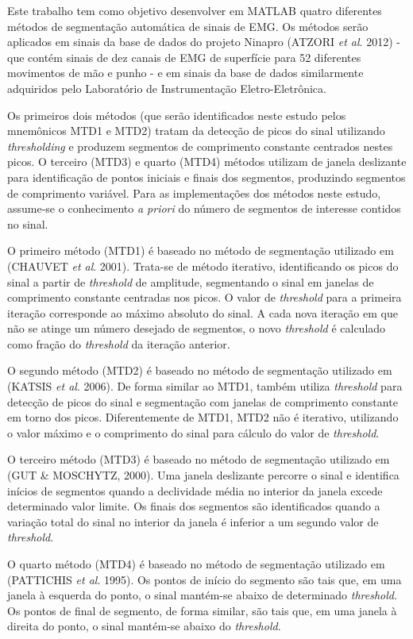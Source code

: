\documentclass[
	12pt,				%
	openright,			%
	oneside,			%
	a4paper,			%
	english,			%
	francais,			%
	spanish,			%
	brazil				%
	]{abntex2}
\begin{document}
Este trabalho tem como objetivo desenvolver em MATLAB quatro diferentes métodos de segmentação automática de sinais de EMG. Os métodos serão aplicados em sinais da base de dados do projeto Ninapro (ATZORI \emph{et al}. 2012) - que contém sinais de dez canais de EMG de superfície para 52 diferentes movimentos de mão e punho - e em sinais da base de dados similarmente adquiridos pelo Laboratório de Instrumentação Eletro-Eletrônica.

Os primeiros dois métodos (que serão identificados neste estudo pelos mnemônicos MTD1 e MTD2) tratam da detecção de picos do sinal utilizando \emph{thresholding} e produzem segmentos de comprimento constante centrados nestes picos. O terceiro (MTD3) e quarto (MTD4) métodos utilizam de janela deslizante para identificação de pontos iniciais e finais dos segmentos, produzindo segmentos de comprimento variável. Para as implementações dos métodos neste estudo, assume-se o conhecimento \emph{a priori} do número de segmentos de interesse contidos no sinal.

O primeiro método (MTD1) é baseado no método de segmentação utilizado em (CHAUVET \emph{et al}. 2001). Trata-se de método iterativo, identificando os picos do sinal a partir de \emph{threshold} de amplitude, segmentando o sinal em janelas de comprimento constante centradas nos picos. O valor de \emph{threshold} para a primeira iteração corresponde ao máximo absoluto do sinal. A cada nova iteração em que não se atinge um número desejado de segmentos, o novo \emph{threshold} é calculado como fração do \emph{threshold} da iteração anterior.

O segundo método (MTD2) é baseado no método de segmentação utilizado em (KATSIS \emph{et al}. 2006). De forma similar ao MTD1, também utiliza \emph{threshold} para detecção de picos do sinal e segmentação com janelas de comprimento constante em torno dos picos. Diferentemente de MTD1, MTD2 não é iterativo, utilizando o valor máximo e o comprimento do sinal para cálculo do valor de \emph{threshold}.

O terceiro método (MTD3) é baseado no método de segmentação utilizado em (GUT \& MOSCHYTZ, 2000). Uma janela deslizante percorre o sinal e identifica inícios de segmentos quando a declividade média no interior da janela excede determinado valor limite. Os finais dos segmentos são identificados quando a variação total do sinal no interior da janela é inferior a um segundo valor de \emph{threshold}.

O quarto método (MTD4) é baseado no método de segmentação utilizado em (PATTICHIS \emph{et al}. 1995). Os pontos de início do segmento são tais que, em uma janela à esquerda do ponto, o sinal mantém-se abaixo de determinado \emph{threshold}. Os pontos de final de segmento, de forma similar, são tais que, em uma janela à direita do ponto, o sinal mantém-se abaixo do \emph{threshold}.
\end{document}
